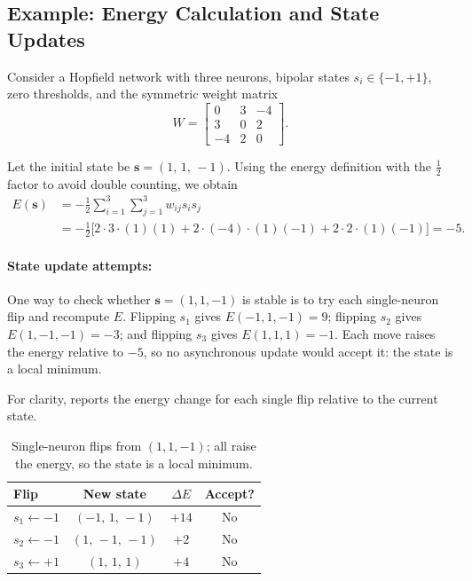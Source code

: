 \subsection{Example: Energy Calculation and State Updates}
\label{sec:hopfield_example_energy_calculation_and_state_updates}

Consider a Hopfield network with three neurons, bipolar states \(s_i \in \{-1,+1\}\), zero thresholds, and the symmetric weight matrix
\[
W = \begin{bmatrix}
0 & 3 & -4 \\
3 & 0 & 2 \\
-4 & 2 & 0
\end{bmatrix}.
\]

Let the initial state be \(\mathbf{s} = (1,\,1,\,-1)\). Using the energy definition with the \(\frac{1}{2}\) factor to avoid double counting, we obtain
\begin{align*}
    E(\mathbf{s}) &= -\frac{1}{2} \sum_{i=1}^3 \sum_{j=1}^3 w_{ij} s_i s_j \\
    &= -\frac{1}{2} \Big[ 2 \cdot 3 \cdot (1)(1) + 2 \cdot (-4) \cdot (1)(-1) + 2 \cdot 2 \cdot (1)(-1) \Big] = -5.
\end{align*}

\paragraph{State update attempts:}
One way to check whether \(\mathbf{s}=(1,1,-1)\) is stable is to try each single-neuron flip and recompute \(E\). Flipping \(s_1\) gives \(E(-1,1,-1)=9\); flipping \(s_2\) gives \(E(1,-1,-1)=-3\); and flipping \(s_3\) gives \(E(1,1,1)=-1\). Each move raises the energy relative to \(-5\), so no asynchronous update would accept it: the state is a local minimum.

For clarity,  reports the energy change for each single flip relative to the current state.
\begin{table}[h]
    \centering
    \begin{tabular}{lccc}
        \toprule
        Flip & New state & \(\Delta E\) & Accept? \\
        \midrule
        \(s_1 \leftarrow -1\) & \((-1,\,1,\,-1)\) & \(+14\) & No \\
        \(s_2 \leftarrow -1\) & \((1,\,-1,\,-1)\) & \(+2\) & No \\
        \(s_3 \leftarrow +1\) & \((1,\,1,\,1)\) & \(+4\) & No \\
        \bottomrule
    \end{tabular}
    \caption{Single-neuron flips from \((1,1,-1)\); all raise the energy, so the state is a local minimum.}
    \label{tab:hopfield-deltaE}
\end{table}

